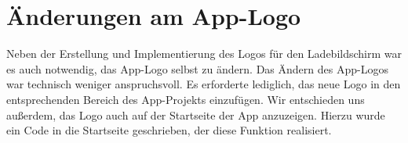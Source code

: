 \section*{Änderungen am App-Logo}
Neben der Erstellung und Implementierung des Logos für den Ladebildschirm war es auch notwendig, das App-Logo selbst zu ändern. Das Ändern des App-Logos war technisch weniger anspruchsvoll. Es erforderte lediglich, das neue Logo in den entsprechenden Bereich des App-Projekts einzufügen. \newline
Wir entschieden uns außerdem, das Logo auch auf der Startseite der App anzuzeigen. Hierzu wurde ein Code in die Startseite geschrieben, der diese Funktion realisiert.
